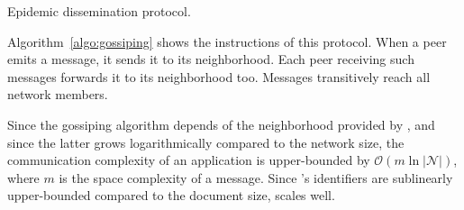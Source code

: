 


\begin{algorithm}[h]
  
  \caption{\label{algo:gossiping}Epidemic dissemination protocol.}
\end{algorithm}

Algorithm~\ref{algo:gossiping} shows the instructions of this protocol. When a
peer emits a message, it sends it to its neighborhood. Each peer receiving such
messages forwards it to its neighborhood too. Messages transitively reach all
network members.

Since the gossiping algorithm depends of the neighborhood provided by \SPRAY,
and since the latter grows logarithmically compared to the network size, the
communication complexity of an application is upper-bounded by
$\mathcal{O}(m \ln |\mathcal{N}|)$, where $m$ is the space complexity of a
message. Since \CRATE's identifiers are sublinearly upper-bounded compared to
the document size, \CRATE scales well.


